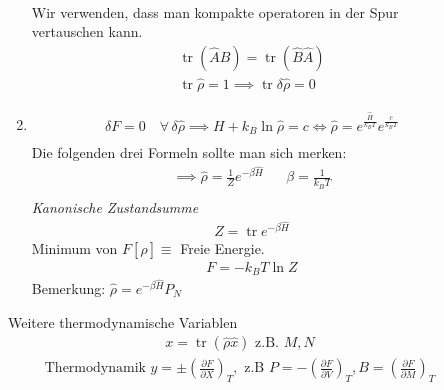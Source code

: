 \documentclass[11pt]{article}
\theoremstyle{plain}
\theoremstyle{mytheoremstyle}
\newcommand{\pd}[2]{\frac{\partial #1 }{\partial #2}}
\newcommand{\trace}{\operatorname{tr}}
\begin{document}
\begin{description}
\begin{enumerate}
\begin{align*}
      \end{align*}
      Wir verwenden, dass man kompakte operatoren in der Spur vertauschen kann.
      \begin{align*}
        \trace (\hat{A} \hat{B}) = \trace (\hat{B} \hat{A})  \\
        \trace \hat{\rho} = 1 \implies \trace \delta \hat{\rho} = 0
      \end{align*}
    \item
      \begin{align*}
        \delta F = 0 \quad\forall\, \delta \hat{\rho} \implies 
        H + k_B \ln{\hat{\rho}} = c \iff
        \hat{\rho} = e^{ \frac{\hat{H}}{k_B T} } e^{ \frac{c}{ k_B T}} \\
      \end{align*}
      Die folgenden drei Formeln sollte man sich merken:
      \begin{align*}
        \implies \hat{\rho} = \frac{1}{Z} e^{-\beta \hat{H}} && \beta = \frac{1}{k_B T} \\
      \end{align*}
      \emph{Kanonische Zustandsumme}
      \begin{align*}
         Z = \trace e^{-\beta \hat{H}} 
      \end{align*}
      Minimum von $F[\hat{\rho}] \equiv $ Freie Energie.
      \begin{align*}
        F = -k_B T \ln{Z} 
      \end{align*}
      Bemerkung: $\hat{\rho} = e^{-\beta \hat{H}} P_N$ %
    \end{enumerate}
    Weitere thermodynamische Variablen %
    \begin{align*}
      x = \trace (\hat{\rho} \hat{x}) \text{ z.B. } M,N
    \end{align*}
    \begin{align*}
      \text{Thermodynamik } y = \pm \left( \pd{F}{X}  \right)_T, 
      \text{ z.B } P = - \left( \pd{F}{V} \right)_T, B = 
      \left( \pd{F}{M} \right)_T
    \end{align*}
\end{description}
\end{document}
